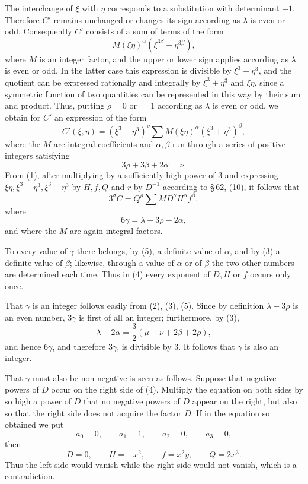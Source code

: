 \documentclass[11pt]{article}
\begin{document}
The interchange of $\xi$ with $\eta$ corresponds to a substitution with determinant $-1$. Therefore $C'$ remains unchanged or changes its sign according as $\lambda$ is even or odd. Consequently $C'$ consists of a sum of terms of the form
\[
 M(\xi\eta)^\alpha(\xi^{3\beta}\pm\eta^{3\beta}),
\]
where $M$ is an integer factor, and the upper or lower sign applies according as $\lambda$ is even or odd. In the latter case this expression is divisible by $\xi^3-\eta^3$, and the quotient can be expressed rationally and integrally by $\xi^3+\eta^3$ and $\xi\eta$, since a symmetric function of two quantities can be represented in this way by their sum and product. Thus, putting $\rho=0$ or $=1$ according as $\lambda$ is even or odd, we obtain for $C'$ an expression of the form
\[
 C'(\xi,\eta)=(\xi^3-\eta^3)^\rho\sum M(\xi\eta)^\alpha(\xi^3+\eta^3)^\beta,
\]
where the $M$ are integral coefficients and $\alpha,\beta$ run through a series of positive integers satisfying
\begin{equation}
 3\rho+3\beta+2\alpha=\nu.
\tag{3}
\end{equation}
From (1), after multiplying by a sufficiently high power of $3$ and expressing $\xi\eta,\xi^3+\eta^3,\xi^3-\eta^3$ by $H,f,Q$ and $r$ by $D^{-1}$ according to \S\,62, (10), it follows that
\begin{equation}
 3^\sigma C=Q^\rho\sum MD^\gamma H^\alpha f^\beta,
\tag{4}
\end{equation}
where
\begin{equation}
 6\gamma=\lambda-3\rho-2\alpha,
\tag{5}
\end{equation}
and where the $M$ are again integral factors.

To every value of $\gamma$ there belongs, by (5), a definite value of $\alpha$, and by (3) a definite value of $\beta$; likewise, through a value of $\alpha$ or of $\beta$ the two other numbers are determined each time. Thus in (4) every exponent of $D,H$ or $f$ occurs only once.

That $\gamma$ is an integer follows easily from (2), (3), (5). Since by definition $\lambda-3\rho$ is an even number, $3\gamma$ is first of all an integer; furthermore, by (3),
\[
 \lambda-2\alpha=\frac32(\mu-\nu+2\beta+2\rho),
\]
and hence $6\gamma$, and therefore $3\gamma$, is divisible by $3$. It follows that $\gamma$ is also an integer.

That $\gamma$ must also be non-negative is seen as follows. Suppose that negative powers of $D$ occur on the right side of (4). Multiply the equation on both sides by so high a power of $D$ that no negative powers of $D$ appear on the right, but also so that the right side does not acquire the factor $D$. If in the equation so obtained we put
\begin{equation}
 a_0=0,
 \qquad a_1=1,
 \qquad a_2=0,
 \qquad a_3=0,
\tag{6}
\end{equation}
then
\begin{equation}
 D=0,
 \qquad H=-x^2,
 \qquad f=x^2y,
 \qquad Q=2x^3.
\tag{7}
\end{equation}
Thus the left side would vanish while the right side would not vanish, which is a contradiction.
\end{document}
